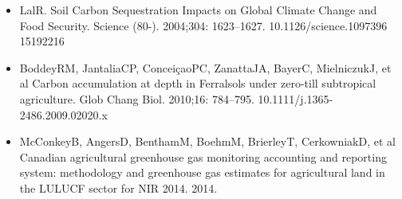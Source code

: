 \documentclass[11pt,a4paper]{article}
\begin{document}
\begin{itemize}
\item LalR. Soil Carbon Sequestration Impacts on Global Climate Change and Food Security. Science (80-). 2004;304: 1623–1627. 10.1126/science.1097396 15192216
\item BoddeyRM, JantaliaCP, ConceiçaoPC, ZanattaJA, BayerC, MielniczukJ, et al Carbon accumulation at depth in Ferralsols under zero-till subtropical agriculture. Glob Chang Biol. 2010;16: 784–795. 10.1111/j.1365-2486.2009.02020.x
\item McConkeyB, AngersD, BenthamM, BoehmM, BrierleyT, CerkowniakD, et al Canadian agricultural greenhouse gas monitoring accounting and reporting system: methodology and greenhouse gas estimates for agricultural land in the LULUCF sector for NIR 2014. 2014.
\end{itemize}
\end{document}
